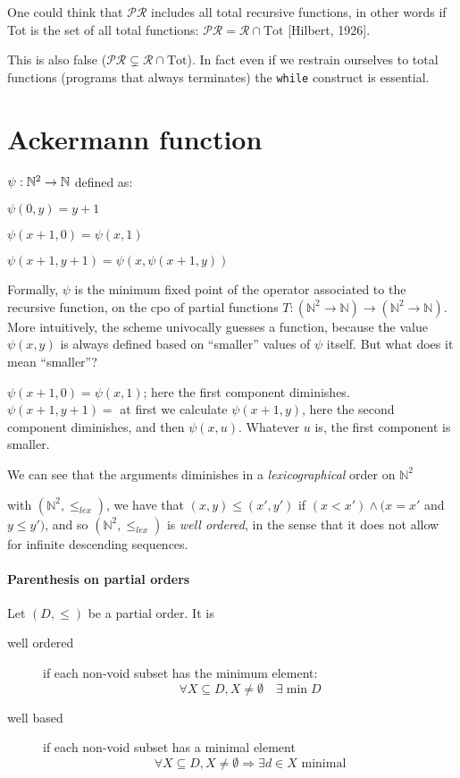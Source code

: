 One could think that $\mathcal{PR}$ includes all total recursive
functions, in other words if Tot is the set of all total functions:
$\mathcal{PR} = \mathcal{R} \cap \text{Tot}$ [Hilbert, 1926].

This is also false
($\mathcal{PR} \subsetneq \mathcal{R} \cap \text{Tot}$). In fact even
if we restrain ourselves to total functions (programs that always
terminates) the \texttt{while} construct is essential.

\section{Ackermann function}
$ \psi: \mathbb{N}^2 \rightarrow \mathbb{N} $ defined as:

$ \psi(0,y) = y+1 $

$ \psi(x+1,0) = \psi(x,1) $

$ \psi(x+1,y+1) = \psi(x, \psi(x+1, y)) $

Formally, $\psi$ is the minimum fixed point of the operator associated
to the recursive function, on the cpo %
of partial functions
$T: (\mathbb{N}^2 \rightarrow \mathbb{N}) \rightarrow (\mathbb{N}^2
\rightarrow \mathbb{N})$. More intuitively, the scheme univocally
guesses a function, because the value $\psi(x,y)$ is always defined
based on ``smaller'' values of $\psi$ itself. But what does it mean
``smaller''?

$\psi(x+1,0) = \psi(x,1)$; here the first component
diminishes. $\psi(x+1,y+1)=$ at first we calculate $\psi(x+1, y)$,
here the second component diminishes, and then $\psi(x,u)$. Whatever
$u$ is, the first component is smaller.

We can see that the arguments diminishes in a \emph{lexicographical}
order on $\mathbb{N}^2$

with $(\mathbb{N}^2, \leq_{lex} )$, we have that $(x,y) \leq (x', y')$
if $(x < x') \wedge (x=x'$ and $y \leq y')$, and so
$( \mathbb{N}^2, \leq_{lex} )$ is \emph{well ordered}, in the sense
that it does not allow for infinite descending sequences.

\paragraph{Parenthesis on partial orders}
\begin{definition}
  Let $(D, \leq)$ be a partial order. It is
  \begin{description}
  \item[well ordered] if each non-void subset has the minimum element:
    $$\forall X \subseteq D, X \neq \emptyset \quad \exists \min D$$
  \item[well based] if each non-void subset has a minimal element
    $$ \forall X \subseteq D, X \neq \emptyset \Rightarrow \exists d \in X \text{ minimal}$$
  \end{description}
\end{definition}


